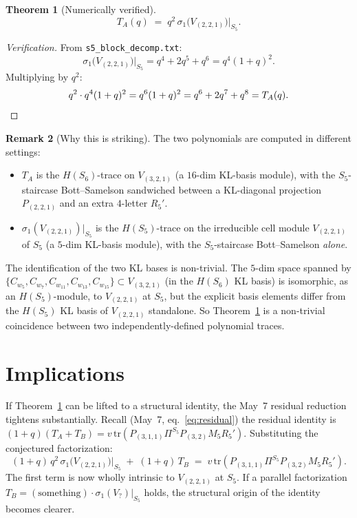 \documentclass[11pt]{article}
\newtheorem{theorem}{Theorem}
\theoremstyle{definition}
\newtheorem{remark}[theorem]{Remark}
\begin{document}
\begin{theorem}[Numerically verified]\label{thm:TA-factor}
\[
T_A(q) \;=\; q^2\,\sigma_1\!\bigl(V_{(2,2,1)}\bigr)\big|_{S_5}.
\]
\end{theorem}

\begin{proof}[Verification]
From \texttt{s5\_block\_decomp.txt}:
\[
\sigma_1\!\bigl(V_{(2,2,1)}\bigr)\big|_{S_5} = q^4 + 2q^5 + q^6 = q^4(1+q)^2.
\]
Multiplying by $q^2$:
\[
q^2 \cdot q^4(1+q)^2 = q^6(1+q)^2 = q^6 + 2q^7 + q^8 = T_A(q). \qedhere
\]
\end{proof}

\begin{remark}[Why this is striking]\label{rem:striking}
The two polynomials are computed in different settings:
\begin{itemize}[leftmargin=2em,topsep=0.3em,itemsep=0.2em]
\item $T_A$ is the $H(S_6)$-trace on $V_{(3,2,1)}$ (a $16$-dim KL-basis module), with the $S_5$-staircase Bott--Samelson sandwiched between a KL-diagonal projection $P_{(2,2,1)}$ and an extra $4$-letter $R_5'$.
\item $\sigma_1(V_{(2,2,1)})\big|_{S_5}$ is the $H(S_5)$-trace on the irreducible cell module $V_{(2,2,1)}$ of $S_5$ (a $5$-dim KL-basis module), with the $S_5$-staircase Bott--Samelson \emph{alone}.
\end{itemize}

The identification of the two KL bases is non-trivial. The $5$-dim space spanned by $\{C_{w_5}, C_{w_7}, C_{w_{11}}, C_{w_{13}}, C_{w_{15}}\} \subset V_{(3,2,1)}$ (in the $H(S_6)$ KL basis) is isomorphic, as an $H(S_5)$-module, to $V_{(2,2,1)}$ at $S_5$, but the explicit basis elements differ from the $H(S_5)$ KL basis of $V_{(2,2,1)}$ standalone. So Theorem~\ref{thm:TA-factor} is a non-trivial coincidence between two independently-defined polynomial traces.
\end{remark}

\section{Implications}

If Theorem~\ref{thm:TA-factor} can be lifted to a structural identity, the May~7 residual reduction tightens substantially. Recall (May~7, eq.~\eqref{eq:residual}) the residual identity is $(1+q)(T_A + T_B) = v\,\mathrm{tr}(P_{(3,1,1)} \Pi^{S_5} P_{(3,2)} M_5 R_5')$. Substituting the conjectured factorization:
\[
(1+q)\,q^2\,\sigma_1\!\bigl(V_{(2,2,1)}\bigr)\big|_{S_5} \;+\; (1+q)\,T_B \;=\; v\,\mathrm{tr}(P_{(3,1,1)} \Pi^{S_5} P_{(3,2)} M_5 R_5').
\]
The first term is now wholly intrinsic to $V_{(2,2,1)}$ at $S_5$. If a parallel factorization $T_B = (\text{something})\cdot \sigma_1(V_?)\big|_{S_5}$ holds, the structural origin of the identity becomes clearer.
\end{document}

